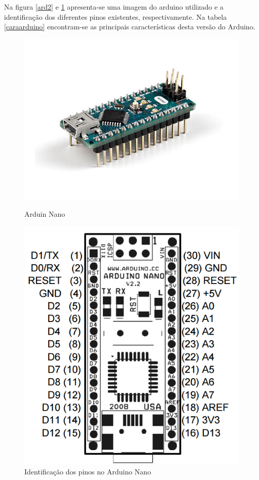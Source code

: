 Na figura \ref{ard2} e \ref{ard1} apresenta-se uma imagem do arduino utilizado e a identificação dos diferentes pinos existentes, respectivamente. Na tabela \ref{caraarduino} encontram-se as principais características desta versão do Arduino. 


\begin{figure}[h]
	\centering
	\begin{minipage}[b]{0.5\textwidth}
		\includegraphics[width=\textwidth]{img/hardware/nano-img.jpg}
		\caption{Arduin Nano}
		\label{ard2}
	\end{minipage}
	\hfill
	\begin{minipage}[b]{0.3\textwidth}
		\includegraphics[width=\textwidth]{img/hardware/nano-esquema.png}
		\caption{Identificação dos pinos no Arduino Nano}
		\label{ard1}
	\end{minipage}
\end{figure}











